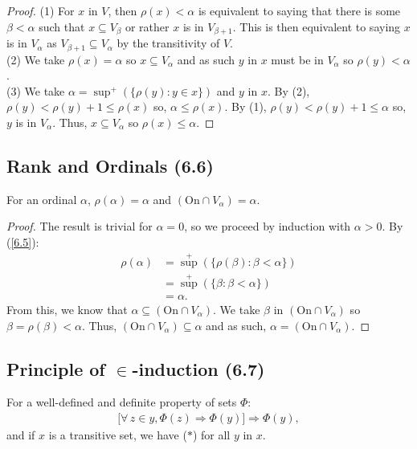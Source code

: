 \begin{proof}
    (1) For $x$ in $V$, then $\rho(x) < \alpha$ is equivalent to
    saying that there is some $\beta < \alpha$ such that $x \subseteq V_\beta$
    or rather $x$ is in $V_{\beta + 1}$. This is then equivalent to
    saying $x$ is in $V_\alpha$ as $V_{\beta + 1} \subseteq V_\alpha$
    by the transitivity of $V$.
    \\[\baselineskip]
    (2) We take $\rho(x) = \alpha$ so $x \subseteq V_\alpha$ and as such
    $y$ in $x$ must be in $V_\alpha$ so $\rho(y) < \alpha$.
    \\[\baselineskip]
    (3) We take $\alpha = \sup^+(\{\rho(y) : y \in x\})$ and $y$ in $x$.
    By (2), $\rho(y) < \rho(y) + 1 \leq \rho(x)$ so, $\alpha \leq \rho(x)$. 
    By (1), $\rho(y) < \rho(y) + 1 \leq \alpha$ so, $y$ is in $V_\alpha$.
    Thus, $x \subseteq V_\alpha$ so $\rho(x) \leq \alpha$.
\end{proof}

\subsection{Rank and Ordinals (6.6)} \label{6.6}

For an ordinal $\alpha$, $\rho(\alpha) = \alpha$ and 
$(\text{On} \cap V_\alpha) = \alpha$.

\begin{proof}
    The result is trivial for $\alpha = 0$, so we proceed by
    induction with $\alpha > 0$. By (\ref{6.5}): \begin{align*}
        \rho(\alpha) 
        &= {\sup}^+(\{\rho(\beta) : \beta < \alpha\}) \\
        &= {\sup}^+(\{\beta : \beta < \alpha\}) \tag{IH} \\
        &= \alpha.
    \end{align*} From this, we know that 
    $\alpha \subseteq (\text{On} \cap V_\alpha)$. We take
    $\beta$ in $(\text{On} \cap V_\alpha)$ so 
    $\beta = \rho(\beta) < \alpha$. 
    Thus, $(\text{On} \cap V_\alpha) \subseteq \alpha$ and as such,
    $\alpha = (\text{On} \cap V_\alpha)$.
\end{proof}

\subsection{Principle of $\in$-induction (6.7)} \label{6.7}

For a well-defined and definite property of sets $\Phi$: \begin{align*}
    \bigl[ \forall \, z \in y, \Phi(z) \Longrightarrow \Phi(y) \bigr] 
    \Longrightarrow 
    \Phi(y), \tag{$\ast$}
\end{align*} and if $x$ is a transitive set, we have ($\ast$)
for all $y$ in $x$.

